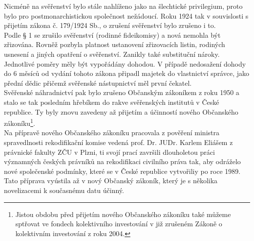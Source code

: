 \documentclass{article}
\begin{document}
Nicméně na svěřenství bylo stále nahlíženo jako na šlechtické privilegium, proto bylo pro postmonarchistickou společnost nežádoucí. Roku 1924 tak v souvislosti s přijetím zákona č. 179/1924 Sb., o zrušení svěřenství bylo zrušeno i to.\\

Podle § 1 se zrušilo svěřenství (rodinné fideikomisy) a nová nemohla být zřizována. Rovněž pozbyla platnost ustanovení zřizovacích listin, rodiných usnesení a jiných opatření o svěřenství. Zanikly také substituční nároky. Jednotlivé poměry měly být vypořádány dohodou. V případě nedosažení dohody do 6 měsíců od vydání tohoto zákona připadl majetek do vlastnictví správce, jako přední dědic přičemž svěřenské nástupnictví měl první čekatel.\\

Svěřenské náhradnictví pak bylo zrušeno Občanským zákoníkem z roku 1950 a stalo se tak posledním hřebíkem do rakve svěřenských institutů v České republice. Ty byly znovu zavedeny až přijetím a účinností nového Občanského zákoníku\footnote{Jistou obdobu před přijetím nového Občanského zákoníku také můžeme sptřovat ve fondech kolektivního investování v již zrušeném Zákoně o kolektivním investování z roku 2004.}.\\

Na přípravě nového Občanského zákoníku pracovala z pověření ministra spravedlnosti rekodifikační komise vedená prof. Dr. JUDr. Karlem Eliášem z právnické fakulty ZČU v Plzni, ti svojí prací završili dlouholetou práci významných českých právníků na rekodifikaci civilního práva tak, aby odráželo nové společenské podmínky, které se v České republice vytvořiliy po roce 1989. Tato příprava vyústila až v nový Občanský zákoník, který je s několika novelizacemi k současnému datu účinný.\\




\end{document}
